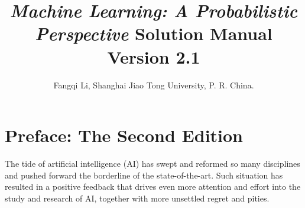 \documentclass[UTF8]{ctexart}
\begin{document}
\title{\emph{Machine Learning: A Probabilistic Perspective} Solution Manual Version 2.1}
\author{Fangqi Li, Shanghai Jiao Tong University, P. R. China.}
\date{}
\maketitle
\tableofcontents
\newpage
\section{Preface: The Second Edition}
The tide of artificial intelligence (AI) has swept and reformed so many disciplines and pushed forward the borderline of the state-of-the-art. 
Such situation has resulted in a positive feedback that drives even more attention and effort into the study and research of AI, together with more unsettled regret and pities. 
\end{document}

